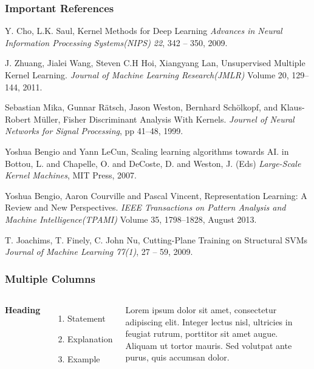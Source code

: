 \documentclass[a4paper,compress,svgnames]{beamer}
\begin{document}
\begin{frame}
\frametitle{Important References}
\footnotesize{
\begin{thebibliography}{99} %
 Y. Cho, L.K. Saul, Kernel Methods  for Deep Learning
\newblock \emph{Advances in Neural Information Processing Systems(NIPS) 22}, 342 -- 350, 2009.

 J. Zhuang, Jialei Wang, Steven C.H Hoi, Xiangyang Lan, Unsupervised Multiple Kernel Learning. \newblock \emph{Journal of Machine Learning Research(JMLR)} Volume 20, 129--144, 2011.

 Sebastian Mika, Gunnar R\"{a}tsch, Jason Weston, Bernhard Sch\"{o}lkopf, and Klaus-Robert M\"{u}ller, Fisher Discriminant Analysis With Kernels. \newblock \emph{Journel of Neural Networks for Signal Processing}, pp 41--48, 1999.

 Yoshua Bengio and Yann LeCun, Scaling learning algorithms towards AI.  in Bottou, L. and Chapelle, O. and DeCoste, D. and Weston, J. (Eds) \newblock \emph{Large-Scale Kernel Machines}, MIT Press,  2007.

 Yoshua Bengio, Aaron Courville and Pascal Vincent, Representation Learning: A Review and New Perspectives. \newblock \emph{IEEE Transactions on Pattern Analysis and Machine Intelligence(TPAMI)} Volume 35, 1798--1828, August 2013.

 T. Joachims, T. Finely, C. John Nu, Cutting-Plane Training on Structural SVMs
\newblock \emph{Journal of Machine Learning 77(1)}, 27 -- 59, 2009.

\end{thebibliography}
}
\end{frame}

\iffalse

\begin{frame}
\frametitle{Multiple Columns}
\begin{columns}[c] %

\textbf{Heading}
\begin{enumerate}
\item Statement
\item Explanation
\item Example
\end{enumerate}

Lorem ipsum dolor sit amet, consectetur adipiscing elit. Integer lectus nisl, ultricies in feugiat rutrum, porttitor sit amet augue. Aliquam ut tortor mauris. Sed volutpat ante purus, quis accumsan dolor.

\end{columns}
\end{frame}
\end{document}
